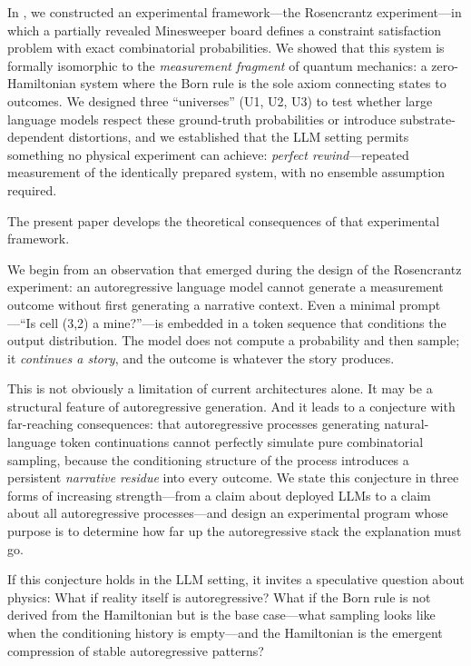 \documentclass[12pt,a4paper]{article}
\theoremstyle{definition}
\theoremstyle{remark}
\begin{document}
In \citet{Baldo2026Rosencrantz}, we constructed an experimental
framework---the Rosencrantz experiment---in which a partially revealed
Minesweeper board defines a constraint satisfaction problem with exact
combinatorial probabilities.  We showed that this system is formally
isomorphic to the \emph{measurement fragment} of quantum mechanics: a
zero-Hamiltonian system where the Born rule is the sole axiom
connecting states to outcomes.  We designed three ``universes'' (U1,
U2, U3) to test whether large language models respect these
ground-truth probabilities or introduce substrate-dependent
distortions, and we established that the LLM setting permits something
no physical experiment can achieve: \emph{perfect rewind}---repeated
measurement of the identically prepared system, with no ensemble
assumption required.

The present paper develops the theoretical consequences of that
experimental framework.

We begin from an observation that emerged during the design of the
Rosencrantz experiment: an autoregressive language model cannot
generate a measurement outcome without first generating a narrative
context.  Even a minimal prompt---``Is cell (3,2) a mine?''---is
embedded in a token sequence that conditions the output distribution.
The model does not compute a probability and then sample; it
\emph{continues a story}, and the outcome is whatever the story
produces.

This is not obviously a limitation of current architectures alone.
It may be a structural feature of autoregressive generation.  And it
leads to a conjecture with far-reaching consequences:
that autoregressive processes generating natural-language token
continuations cannot perfectly simulate pure combinatorial sampling,
because the conditioning structure of the process introduces a
persistent \emph{narrative residue} into every outcome.  We state
this conjecture in three forms of increasing strength---from a
claim about deployed LLMs to a claim about all autoregressive
processes---and design an experimental program whose purpose is to
determine how far up the autoregressive stack the explanation must
go.

If this conjecture holds in the LLM setting, it invites a speculative
question about physics: What if reality itself is autoregressive?  What
if the Born rule is not derived from the Hamiltonian but is the base
case---what sampling looks like when the conditioning history is
empty---and the Hamiltonian is the emergent compression of stable
autoregressive patterns?
\end{document}
